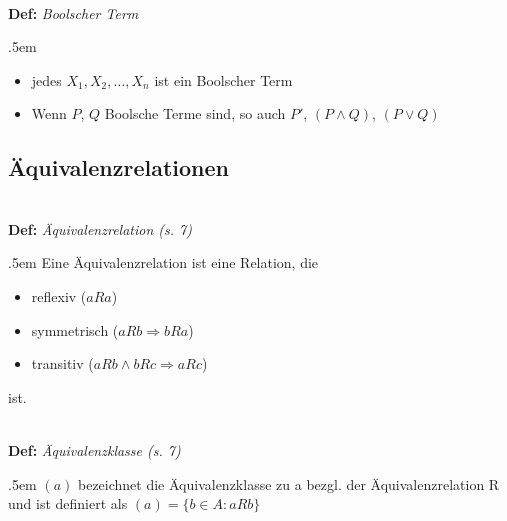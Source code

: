 \documentclass[twocolumn, 10pt]{article}
\newenvironment {definition}
                [1][]
                {\noindent\\{\bf
                Def:}\emph{
                #1}\indent\begin{addmargin}{.5em}}{\end{addmargin}}
\newcommand{\und}{\wedge}
\newcommand{\oder}{\vee}
\begin{document}
\begin{definition}[Boolscher Term]
\begin{itemize}
  \item jedes $X_1, X_2,\ldots ,X_n$ ist ein Boolscher Term
  \item Wenn $P$, $Q$ Boolsche Terme sind, so auch $P'$, $(P\und Q)$, $(P
  \oder Q)$
\end{itemize}
\end{definition}

\subsection*{Äquivalenzrelationen}



\begin{definition}[Äquivalenzrelation (s. 7)]
Eine Äquivalenzrelation ist eine Relation, die 
\begin{itemize}
  \item reflexiv ($aRa$)
  \item symmetrisch ($aRb \Rightarrow bRa$)
  \item transitiv ($aRb \und bRc \Rightarrow aRc$)
\end{itemize}
ist.
\end{definition}

\begin{definition}[Äquivalenzklasse (s. 7)]
$(a)$ bezeichnet die Äquivalenzklasse zu a bezgl. der Äquivalenzrelation R und
ist definiert als $(a) = \{b \in A: aRb\}$
\end{definition}
\end{document}
